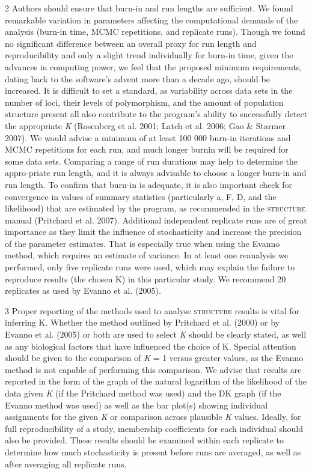2 Authors should ensure that burn-in and run lengths are sufficient. We found remarkable variation in parameters affecting the computational demands of the analysis (burn-in time, MCMC repetitions, and replicate runs). Though we found no significant difference between an overall proxy for run length and reproducibility and only a slight trend individually for burn-in time, given the advances in computing power, we feel that the proposed minimum requirements, dating back to the software’s advent more than a decade ago, should be increased. It is difficult to set a standard, as variability across data sets in the number of loci, their levels of polymorphism, and the amount of population structure present all also contribute to the program’s ability to successfully detect the appropriate \emph{K} (Rosenberg et al. 2001; Latch et al. 2006; Gao \& Starmer 2007). We would advise a minimum of at least 100 000 burn-in iterations and MCMC repetitions for each run, and much longer burnin will be required for some data sets. Comparing a range of run durations may help to determine the appro-priate run length, and it is always advisable to choose a longer burn-in and run length. To confirm that burn-in is adequate, it is also important check for convergence in values of summary statistics (particularly a, F, D, and the likelihood) that are estimated by the program, as recommended in the \textsc{structure} manual (Pritchard et al. 2007). Additional independent replicate runs are of great importance as they limit the influence of stochasticity and increase the precision of the parameter estimates. That is especially true when using the Evanno method, which requires an estimate of variance. In at least one reanalysis we performed, only five replicate runs were used, which may explain the failure to reproduce results (the chosen K) in this particular study. We recommend 20 replicates as used by Evanno et al. (2005).

3 Proper reporting of the methods used to analyse \textsc{structure} results is vital for inferring K. Whether the method outlined by Pritchard et al. (2000) or by Evanno et al. (2005) or both are used to select \emph{K} should be clearly stated, as well as any biological factors that have influenced the choice of K. Special attention should be given to the comparison of \emph{K} = 1 versus greater values, as the Evanno method is not capable of performing this comparison. We advise that results are reported in the form of the graph of the natural logarithm of the likelihood of the data given \emph{K} (if the Pritchard method was used) and the DK graph (if the Evanno method was used) as well as the bar plot(s) showing individual assignments for the given \emph{K} or comparison across plausible \emph{K} values. Ideally, for full reproducibility of a study, membership coefficients for each individual should also be provided. These results should be examined within each replicate to determine how much stochasticity is present before runs are averaged, as well as after averaging all replicate runs.

